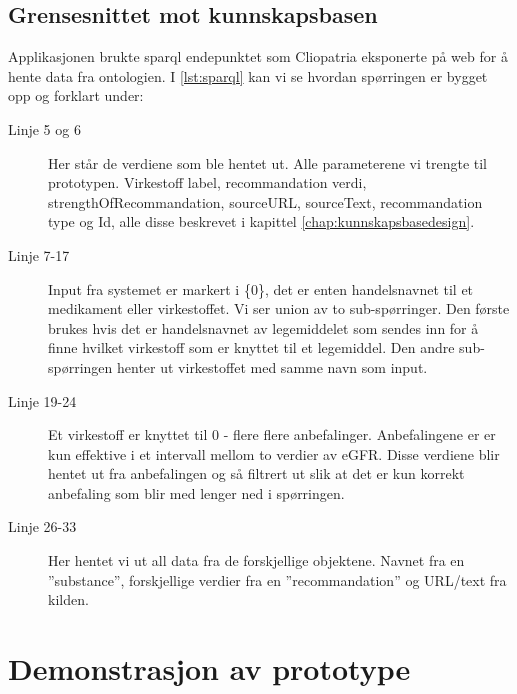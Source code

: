 \subsection{Grensesnittet mot kunnskapsbasen}
Applikasjonen brukte \gls{sparql} endepunktet som Cliopatria eksponerte på web for å hente data fra ontologien. I \ref{lst:sparql} kan vi se hvordan spørringen er bygget opp og forklart under: 
\begin{description}
    \item[Linje  5 og 6] Her står de verdiene som ble hentet ut. Alle parameterene vi trengte til prototypen. Virkestoff label, recommandation verdi, strengthOfRecommandation, sourceURL, sourceText, recommandation type og Id, alle disse beskrevet i kapittel \ref{chap:kunnskapsbasedesign}.
    \item[Linje 7-17] Input fra systemet er markert i \{0\}, det er enten handelsnavnet til et medikament eller virkestoffet. Vi ser union av to sub-spørringer. Den første brukes hvis det er handelsnavnet av legemiddelet som sendes inn for å finne hvilket virkestoff som er knyttet til et legemiddel. Den andre sub-spørringen henter ut virkestoffet med samme navn som input.
    \item[Linje 19-24] Et virkestoff er knyttet til 0 - flere flere anbefalinger. Anbefalingene er er kun effektive i et intervall mellom to verdier av eGFR. Disse verdiene blir hentet ut fra anbefalingen og så filtrert ut slik at det er kun korrekt anbefaling som blir med lenger ned i spørringen.
    \item[Linje 26-33] Her hentet vi ut all data fra de forskjellige objektene. Navnet fra en ''substance'', forskjellige verdier fra en ''recommandation'' og URL/text fra kilden.
\end{description} 


\section{Demonstrasjon av prototype}
